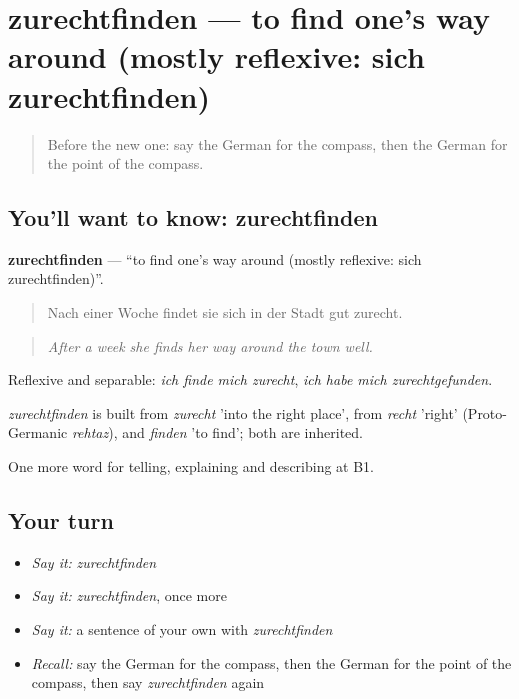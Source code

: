 \section[zurechtfinden]{zurechtfinden — to find one's way around (mostly reflexive: sich zurechtfinden)}

\label{lesson:GE-C433-zurechtfinden}



\begin{quote}
Before the new one: say the German for the compass, then the German for the point of the compass.
\end{quote}

\subsection*{You'll want to know: zurechtfinden}
\textbf{zurechtfinden} — \textquotedblleft{}to find one's way around (mostly reflexive: sich zurechtfinden)\textquotedblright{}.

\begin{quote}
Nach einer Woche findet sie sich in der Stadt gut zurecht.
\end{quote}

\begin{quote}
\emph{After a week she finds her way around the town well.}
\end{quote}

Reflexive and separable: \emph{ich finde mich zurecht}, \emph{ich habe mich zurechtgefunden}.

\begin{cousinweb}
\emph{zurechtfinden} is built from \emph{zurecht} 'into the right place', from \emph{recht} 'right' (Proto-Germanic \emph{rehtaz}), and \emph{finden} 'to find'; both are inherited.
\end{cousinweb}

\begin{grammarlens}[title={What you've built}]
One more word for telling, explaining and describing at B1.
\end{grammarlens}

\subsection*{Your turn}
\begin{itemize}
\raggedright
  \item \emph{Say it:} \emph{zurechtfinden}
  \item \emph{Say it:} \emph{zurechtfinden}, once more
  \item \emph{Say it:} a sentence of your own with \emph{zurechtfinden}
  \item \emph{Recall:} say the German for the compass, then the German for the point of the compass, then say \emph{zurechtfinden} again
\end{itemize}

